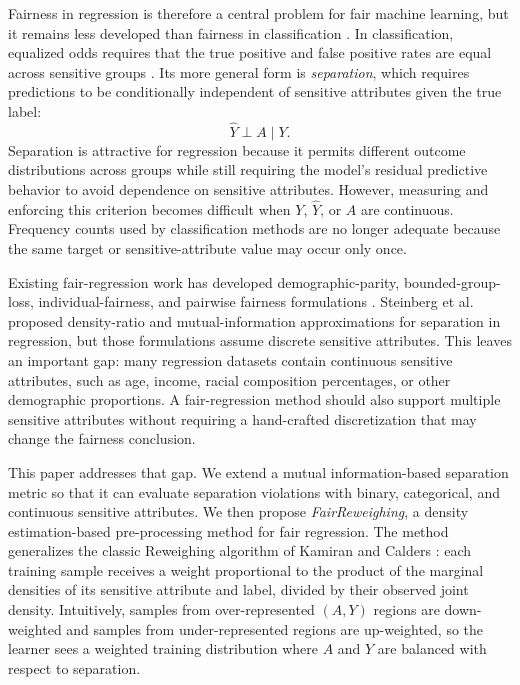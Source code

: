 Fairness in regression is therefore a central problem for fair machine learning, but it remains less developed than fairness in classification \cite{berk2017convex}. In classification, equalized odds requires that the true positive and false positive rates are equal across sensitive groups \cite{hardt2016equality}. Its more general form is \emph{separation}, which requires predictions to be conditionally independent of sensitive attributes given the true label:
\begin{equation}
\hat{Y} \perp A \mid Y.
\end{equation}
Separation is attractive for regression because it permits different outcome distributions across groups while still requiring the model's residual predictive behavior to avoid dependence on sensitive attributes. However, measuring and enforcing this criterion becomes difficult when $Y$, $\hat{Y}$, or $A$ are continuous. Frequency counts used by classification methods are no longer adequate because the same target or sensitive-attribute value may occur only once.

Existing fair-regression work has developed demographic-parity, bounded-group-loss, individual-fairness, and pairwise fairness formulations \cite{berk2017convex,agarwal2019fair,jiang2022generalized,narasimhan2020pairwise}. Steinberg et al.~\cite{steinberg2020fairness} proposed density-ratio and mutual-information approximations for separation in regression, but those formulations assume discrete sensitive attributes. This leaves an important gap: many regression datasets contain continuous sensitive attributes, such as age, income, racial composition percentages, or other demographic proportions. A fair-regression method should also support multiple sensitive attributes without requiring a hand-crafted discretization that may change the fairness conclusion.

This paper addresses that gap. We extend a mutual information-based separation metric so that it can evaluate separation violations with binary, categorical, and continuous sensitive attributes. We then propose \emph{FairReweighing}, a density estimation-based pre-processing method for fair regression. The method generalizes the classic Reweighing algorithm of Kamiran and Calders \cite{kamiran12}: each training sample receives a weight proportional to the product of the marginal densities of its sensitive attribute and label, divided by their observed joint density. Intuitively, samples from over-represented $(A,Y)$ regions are down-weighted and samples from under-represented regions are up-weighted, so the learner sees a weighted training distribution where $A$ and $Y$ are balanced with respect to separation.

